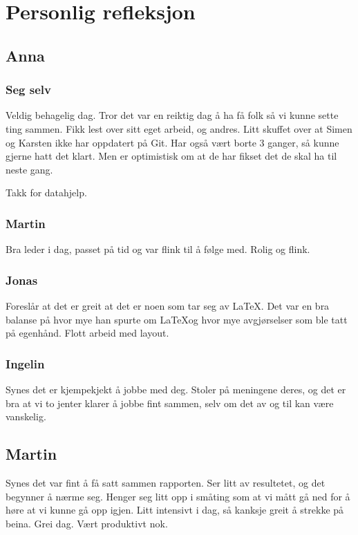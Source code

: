 \documentclass[DIV=calc, paper=a4, fontsize=12pt]{scrartcl}
\begin{document}
\section{Personlig refleksjon}
\subsection{Anna}
\subsubsection{Seg selv}
Veldig behagelig dag. Tror det var en reiktig dag å ha få folk så vi kunne sette ting sammen. Fikk lest over sitt eget arbeid, og andres. Litt skuffet over at Simen og Karsten ikke har oppdatert på Git. Har også vært borte 3 ganger, så kunne gjerne hatt det klart. Men er optimistisk om at de har fikset det de skal ha til neste gang.

Takk for datahjelp.

\subsubsection{Martin}
Bra leder i dag, passet på tid og var flink til å følge med. Rolig og flink.

\subsubsection{Jonas}
Foreslår at det er greit at det er noen som tar seg av \LaTeX. Det var en bra balanse på hvor mye han spurte om \LaTeX og hvor mye avgjørselser som ble tatt på egenhånd. Flott arbeid med layout.

\subsubsection{Ingelin}
Synes det er kjempekjekt å jobbe med deg. Stoler på meningene deres, og det er bra at vi to jenter klarer å jobbe fint sammen, selv om det av og til kan være vanskelig.

\subsection{Martin}
Synes det var fint å få satt sammen rapporten. Ser litt av resultetet, og det begynner å nærme seg. Henger seg litt opp i småting som at vi mått gå ned for å høre at vi kunne gå opp igjen. Litt intensivt i dag, så kanksje greit å strekke på beina. Grei dag. Vært produktivt nok.
\end{document}
